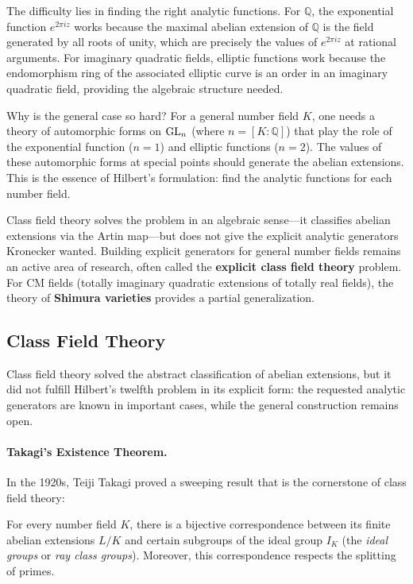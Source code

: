 The difficulty lies in finding the right analytic functions. For $\mathbb{Q}$, the exponential function $e^{2\pi i z}$ works because the maximal abelian extension of $\mathbb{Q}$ is the field generated by all roots of unity, which are precisely the values of $e^{2\pi i z}$ at rational arguments. For imaginary quadratic fields, elliptic functions work because the endomorphism ring of the associated elliptic curve is an order in an imaginary quadratic field, providing the algebraic structure needed.

Why is the general case so hard? For a general number field $K$, one needs a theory of automorphic forms on $\operatorname{GL}_n$ (where $n = [K:\mathbb{Q}]$) that play the role of the exponential function ($n=1$) and elliptic functions ($n=2$). The values of these automorphic forms at special points should generate the abelian extensions. This is the essence of Hilbert's formulation: find the analytic functions for each number field.

Class field theory solves the problem in an algebraic sense---it classifies abelian extensions via the Artin map---but does not give the explicit analytic generators Kronecker wanted. Building explicit generators for general number fields remains an active area of research, often called the \textbf{explicit class field theory} problem. For CM fields (totally imaginary quadratic extensions of totally real fields), the theory of \textbf{Shimura varieties} provides a partial generalization.

\subsection{Class Field Theory}

Class field theory solved the abstract classification of abelian extensions, but it did not fulfill Hilbert's twelfth problem in its explicit form: the requested analytic generators are known in important cases, while the general construction remains open.

\paragraph{Takagi's Existence Theorem.} In the 1920s, Teiji Takagi proved a sweeping result that is the cornerstone of class field theory:

\begin{theorem}[Takagi, 1920]\label{thm:takagi-cft}
For every number field $K$, there is a bijective correspondence between its finite abelian extensions $L/K$ and certain subgroups of the ideal group $I_K$ (the \emph{ideal groups} or \emph{ray class groups}). Moreover, this correspondence respects the splitting of primes.
\end{theorem}

